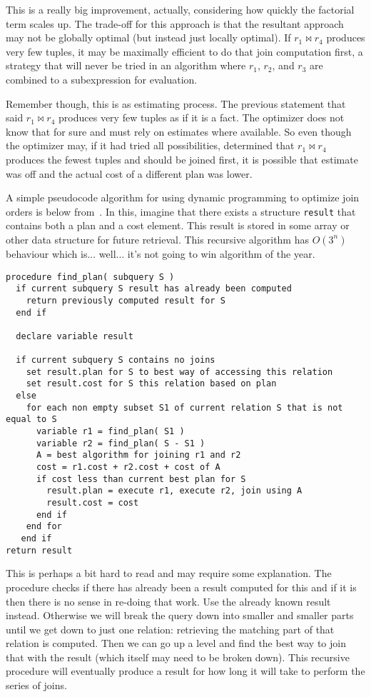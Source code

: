 This is a really big improvement, actually, considering how quickly the factorial term scales up. The trade-off for this approach is that the resultant approach may not be globally optimal (but instead just locally optimal). If $r_{1} \bowtie r_{4}$ produces very few tuples, it may be maximally efficient to do that join computation first, a strategy that will never be tried in an algorithm where $r_{1}$, $r_{2}$, and $r_{3}$ are combined to a subexpression for evaluation. 

Remember though, this is as estimating process. The previous statement that said $r_{1} \bowtie r_{4}$ produces very few tuples as if it is a fact. The optimizer does not know that for sure and must rely on estimates where available. So even though the optimizer may, if it had tried all possibilities, determined that $r_{1} \bowtie r_{4}$ produces the fewest tuples and should be joined first, it is possible that estimate was off and the actual cost of a different plan was lower.

A simple pseudocode algorithm for using dynamic programming to optimize join orders is below from~\cite{dsc}. In this, imagine that there exists a structure \texttt{result} that contains both a plan and a cost element. This result is stored in some array or other data structure for future retrieval. This recursive algorithm has $O(3^{n})$ behaviour which is... well... it's not going to win algorithm of the year.

\begin{verbatim}
procedure find_plan( subquery S ) 
  if current subquery S result has already been computed
    return previously computed result for S
  end if

  declare variable result

  if current subquery S contains no joins
    set result.plan for S to best way of accessing this relation
    set result.cost for S this relation based on plan
  else 
    for each non empty subset S1 of current relation S that is not equal to S
      variable r1 = find_plan( S1 ) 
      variable r2 = find_plan( S - S1 )
      A = best algorithm for joining r1 and r2
      cost = r1.cost + r2.cost + cost of A
      if cost less than current best plan for S
        result.plan = execute r1, execute r2, join using A
        result.cost = cost
      end if  
    end for
   end if
return result
\end{verbatim}

This is perhaps a bit hard to read and may require some explanation. The procedure checks if there has already been a result computed for this and if it is then there is no sense in re-doing that work. Use the already known result instead. Otherwise we will break the query down into smaller and smaller parts until we get down to just one relation: retrieving the matching part of that relation is computed. Then we can go up a level and find the best way to join that with the result (which itself may need to be broken down). This recursive procedure will eventually produce a result for how long it will take to perform the series of joins.

